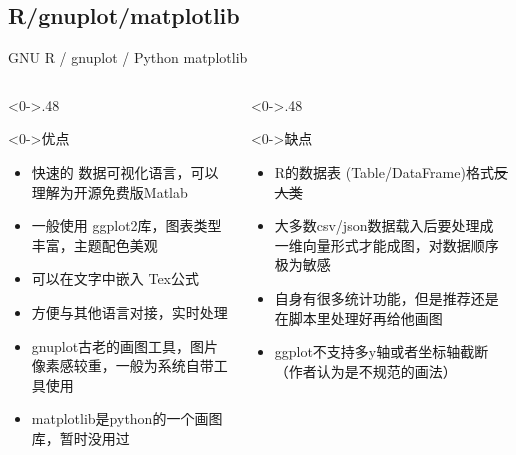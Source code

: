 \documentclass[utf8,dvipsnames,aspectratio=169]{beamer}
\newcommand\mk[1]{{\color{RoyalBlue} #1}}
\begin{document}
\subsection{R/gnuplot/matplotlib}
\begin{frame}{GNU R / gnuplot / Python matplotlib}
	\begin{columns}
		\begin{column}<0->{.48\textwidth}
			\begin{exampleblock}<0->{\centering 优点}
				\begin{itemize}
					\item<0-> 快速的\mk{数据可视化语言}，可以理解为开源免费版Matlab
					\item<0-> 一般使用\mk{ggplot2}库，图表类型丰富，主题配色美观
					\item<0-> 可以在文字中嵌入\mk{Tex公式}
					\item<0-> 方便与其他语言对接，实时处理
					\item<0-> \mk{gnuplot}古老的画图工具，图片像素感较重，一般为系统自带工具使用
					\item<0-> \mk{matplotlib}是python的一个画图库，暂时没用过
				\end{itemize}
			\end{exampleblock}
		\end{column}
		\begin{column}<0->{.48\textwidth}
			\begin{alertblock}<0->{\centering 缺点}
				\vspace{0.5em}
				\begin{itemize}
					\item<0-> R的数据表\mk{(Table/DataFrame)}格式\sout{反人类}
					\item<0-> 大多数csv/json数据载入后要处理成\mk{一维向量}形式才能成图，对数据顺序极为敏感
					\item<0-> 自身有很多统计功能，但是推荐还是在脚本里处理好再给他画图
					\item<0-> ggplot不支持多y轴或者坐标轴截断（作者认为是不规范的画法）
				\end{itemize}
				\vspace{0.5em}
			\end{alertblock}
		\end{column}
	\end{columns}
\end{frame}
\end{document}
